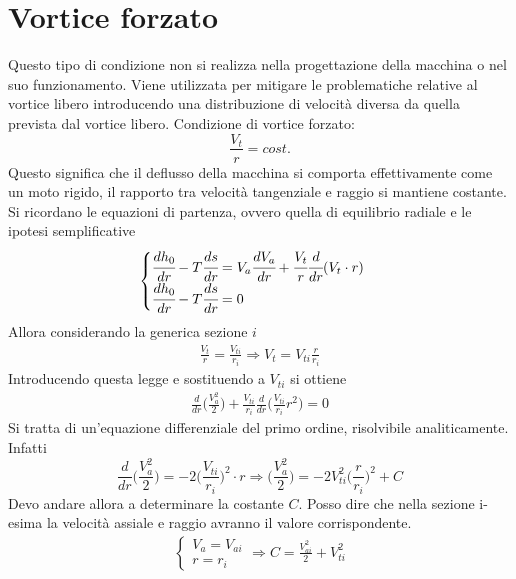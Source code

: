 \section{Vortice forzato}
Questo tipo di condizione non si realizza nella progettazione della macchina o nel suo funzionamento. Viene utilizzata per mitigare le problematiche relative al vortice libero introducendo una distribuzione di velocità diversa da quella prevista dal vortice libero. Condizione di vortice forzato:
\begin{equation}
\boxed{\frac{V_t}{r} = cost.}
\label{eq:VortForz}
\end{equation}
Questo significa che il deflusso della macchina si comporta effettivamente come un moto rigido, il rapporto tra velocità tangenziale e raggio si mantiene costante.
Si ricordano le equazioni di partenza, ovvero quella di equilibrio radiale e le ipotesi semplificative
\begin{align*}
\begin{cases}
\cfrac{dh_0}{dr} - T\cfrac{ds}{dr} = V_a \cfrac{dV_a}{dr} + \cfrac{V_t}{r} \cfrac{d}{dr}(V_t \cdot r)\\
\cfrac{dh_0}{dr} - T\cfrac{ds}{dr} = 0
\end{cases}
\end{align*}
Allora considerando la generica sezione $i$
\begin{align*}
\frac{V_t}{r} = \frac{V_{ti}}{r_i} \Rightarrow V_t = V_{ti} \frac{r}{r_i}
\end{align*}
Introducendo questa legge e sostituendo a $V_{ti}$ si ottiene
\begin{align*}
\boxed{\frac{d}{dr}\bigg( \frac{V_a^2}{2} \bigg) + \frac{V_{ti}}{r_i} \frac{d}{dr} \bigg(\frac{V_{ti}}{r_i} r^2 \bigg) = 0}
\end{align*}
Si tratta di un'equazione differenziale del primo ordine, risolvibile analiticamente. Infatti
\begin{equation}
\frac{d}{dr} \bigg( \frac{V_a^2}{2} \bigg) = -2 \bigg( \frac{V_{ti}}{r_i} \bigg) ^2 \cdot r
\Rightarrow
\bigg( \frac{V_a^2}{2} \bigg) = -2 V_{ti}^2 \bigg(\frac{r}{r_i} \bigg)^2 +C
\label{eq:SolCost}
\end{equation}
Devo andare allora a determinare la costante $C$. Posso dire che nella sezione i-esima la velocità assiale e raggio avranno il valore corrispondente.
\begin{align*}
\begin{cases}
V_a=V_{ai}\\
r=r_i
\end{cases}
\Rightarrow
C = \frac{V_{ai}^2}{2} + V_{ti}^2
\end{align*}
